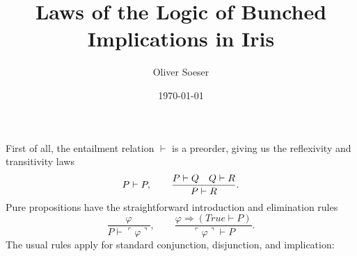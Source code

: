 \documentclass[12pt]{article}
\title{Laws of the Logic of Bunched Implications in Iris}
\author{Oliver Soeser}
\date{\today}
\newcommand{\ent}{\vdash}
\renewcommand{\phi}{\varphi}
\newcommand{\pure}[1]{\ulcorner #1 \urcorner}
\newcommand{\imp}{\Rightarrow}
\begin{document}
\maketitle

First of all, the entailment relation $\ent$ is a preorder, giving us the reflexivity and transitivity laws
\begin{equation*}
  P \ent P, \qquad \frac{P \ent Q \quad Q \ent R}{P\ent R}.\\
\end{equation*}
Pure propositions have the straightforward introduction and elimination rules
\begin{equation*}
  \frac{\phi}{P \ent \pure\phi},\qquad \frac{\phi \imp  (True \ent P)}{\pure\phi \ent P}.
\end{equation*}
The usual rules apply for standard conjunction, disjunction, and implication:
\end{document}
